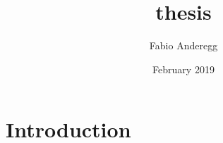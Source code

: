 \documentclass{article}
\title{thesis}
\author{Fabio Anderegg }
\date{February 2019}
\begin{document}
\maketitle

\section{Introduction}
\end{document}
